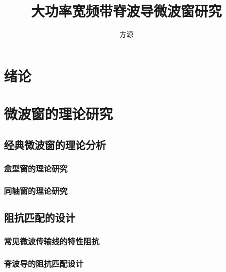 \documentclass[master]{thesis-uestc}
\title{大功率宽频带脊波导微波窗研究}{English Title} %
\author{方源}{English Name} %
\begin{document}
\makecover %
\originalitydeclaration %
\begin{chineseabstract}

\end{chineseabstract}
\begin{englishabstract}

\end{englishabstract}

\thesistableofcontents %
\thesisfigurelist %
\thesistablelist %
\thesisglossarylist %
\thesissymbollist %



\chapter{绪\hspace{6pt}论}

\chapter{微波窗的理论研究}
\section{经典微波窗的理论分析}
\subsection{盒型窗的理论研究}
\subsection{同轴窗的理论研究}
\section{阻抗匹配的设计}
\subsection{常见微波传输线的特性阻抗}
\subsection{脊波导的阻抗匹配设计}
\end{document}
